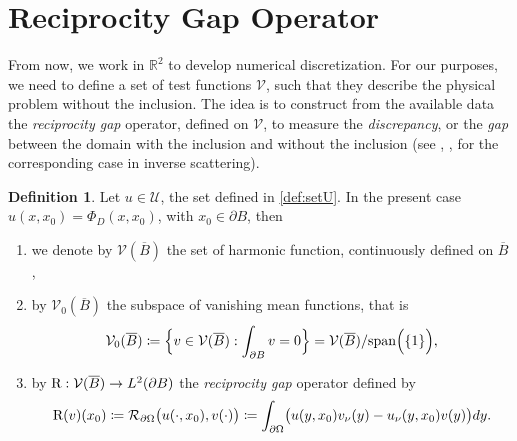 \documentclass[10pt, a4paper, twoside, openright]{book}
\theoremstyle{definition}
\newtheorem{definition}[subsection]{Definition}
\theoremstyle{plain}
\theoremstyle{plain}
\theoremstyle{plain}
\theoremstyle{plain}
\theoremstyle{plain}
\theoremstyle{plain}
\theoremstyle{plain}
\theoremstyle{plain}
\begin{document}
\section{Reciprocity Gap Operator}
From now, we work in $\mathbb{R}^2$ to develop numerical discretization. 
For our purposes, we need to define a set of test functions $\mathcal{V}$, such that 
they describe the physical problem without the inclusion. The idea is to construct from the available 
data the \emph{reciprocity gap} operator, defined on $\mathcal{V}$, to measure the \emph{discrepancy}, or the \emph{gap} 
between the domain with the inclusion and without the inclusion 
(see \cite{colton-haddar:rg}, \cite{dicristo-sun:2006}, \cite{dicristo-sun:2007} 
for the corresponding case in inverse scattering).
\begin{definition}
\label{def:setV}
Let $u\in\mathcal{U}$, the set defined in \ref{def:setU}. In the present case $u(x,x_0)=\Phi_D(x,x_0)$, with $x_0 \in \partial B$, then
\begin{enumerate}
 \item we denote by $\mathcal{V}(\overline{B})$ the set of harmonic function, continuously defined on $\overline{B}$,
 \item by $\mathcal{V}_0(\overline{B})$ the subspace of vanishing mean functions, that is
 \begin{equation}
  \mathcal{V}_0(\overline{B})\coloneqq\Bigl\{v\in\mathcal{V}(\overline{B}):\int_{\partial B} v = 0\Bigr\}=\mathcal{V}(\overline{B})/\textup{span}\Bigl(\{1\}\Bigr),
 \end{equation}
 \item by $\textup{R} : \mathcal{V}(\overline{B})\to L^2(\partial B)$ the \emph{reciprocity gap} operator defined by
\begin{equation}
 \textup{R}(v)(x_0)\coloneqq \mathcal{R}_{\partial\Omega}\bigl(u(\cdot,x_0),v(\cdot)\bigr)\coloneqq \int_{\partial \Omega}\bigl(u(y,x_0)v_\nu (y) - u_\nu(y,x_0)v(y)\bigr)dy.
\end{equation}
\end{enumerate}
\end{definition}
\begin{figure}[]
\begin{center}
\end{center}
\end{figure}
\end{document}
